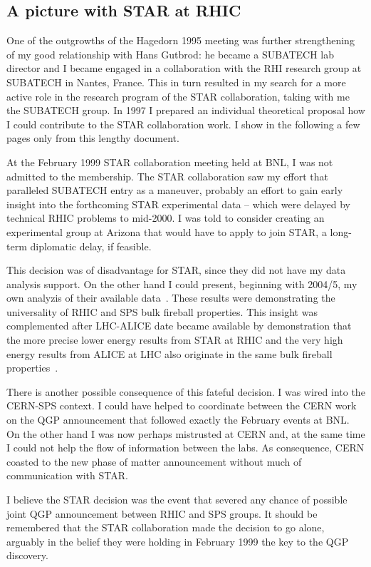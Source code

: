\subsection{A picture with  STAR at RHIC}
% 
One of the outgrowths of the Hagedorn 1995 meeting was further strengthening of my good relationship with Hans Gutbrod: he became a SUBATECH  lab director and I became engaged in a collaboration  with the RHI research group at SUBATECH in Nantes, France. This in turn  resulted in  my search for a more active role in the research program of the STAR collaboration, taking with me the SUBATECH group. In  1997 I prepared  an individual theoretical proposal how I could contribute to the STAR collaboration work. I show in the following a few pages only from this lengthy document.

At the February 1999  STAR collaboration meeting  held at BNL, I was  not admitted to the membership. The  STAR collaboration saw my effort that paralleled SUBATECH entry as a maneuver, probably an effort to gain early insight into the forthcoming STAR experimental data -- which were delayed  by technical RHIC problems to mid-2000. I was told to consider creating an experimental group at Arizona that would have to apply to join STAR, a long-term diplomatic delay, if feasible.  

This decision  was  of disadvantage for STAR, since they did not have my data analysis support. On the other hand I could  present, beginning with 2004/5, my own analyzis of their available data~\cite{Rafelski:2004dp,Letessier:2005kc}. These results were demonstrating the universality of RHIC and SPS bulk fireball properties. This insight was complemented after LHC-ALICE date became available by demonstration that the more precise lower energy results from STAR at RHIC and the very high energy results from ALICE at LHC also originate in the same bulk fireball properties~\cite{Petran:2013qla,Rafelski:2014cqa}. 

There is another possible consequence of this fateful decision. I  was wired into the CERN-SPS context. I could have helped to coordinate between the CERN work on the QGP announcement that followed exactly the February  events at BNL. On the other hand I was now perhaps mistrusted at CERN and, at the same time I could not help the flow of information between the labs. As consequence, CERN coasted to the new phase of matter announcement without much of communication with STAR.  

I believe the STAR decision  was the event that severed any chance of possible joint QGP announcement between RHIC and SPS groups. It should be remembered that the STAR  collaboration  made the decision to go alone, arguably in the belief they were holding in February 1999 the key to the QGP discovery.\\

